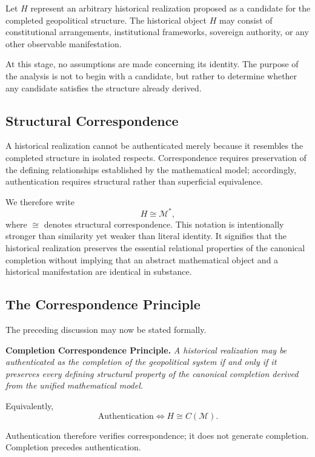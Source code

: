\documentclass[11pt,openany]{book}
\theoremstyle{plain}
\theoremstyle{definition}
\begin{document}
Let \(H\) represent an arbitrary historical realization proposed as a candidate for the completed geopolitical structure. The historical object \(H\) may consist of constitutional arrangements, institutional frameworks, sovereign authority, or any other observable manifestation. 

At this stage, no assumptions are made concerning its identity. The purpose of the analysis is not to begin with a candidate, but rather to determine whether any candidate satisfies the structure already derived.

\subsection*{Structural Correspondence}

A historical realization cannot be authenticated merely because it resembles the completed structure in isolated respects. Correspondence requires preservation of the defining relationships established by the mathematical model; accordingly, authentication requires structural rather than superficial equivalence.

We therefore write
\[
\boxed{
H \cong \mathcal{M}^{*},
}
\]
where \(\cong\) denotes structural correspondence. This notation is intentionally stronger than similarity yet weaker than literal identity. It signifies that the historical realization preserves the essential relational properties of the canonical completion without implying that an abstract mathematical object and a historical manifestation are identical in substance.

\subsection*{The Correspondence Principle}

The preceding discussion may now be stated formally.

\medskip
\noindent\textbf{Completion Correspondence Principle.} 
\emph{A historical realization may be authenticated as the completion of the geopolitical system if and only if it preserves every defining structural property of the canonical completion derived from the unified mathematical model.}
\medskip

Equivalently,
\[
\boxed{
\text{Authentication} \Longleftrightarrow H \cong C(\mathcal{M}).
}
\]

Authentication therefore verifies correspondence; it does not generate completion. Completion precedes authentication.
\end{document}
